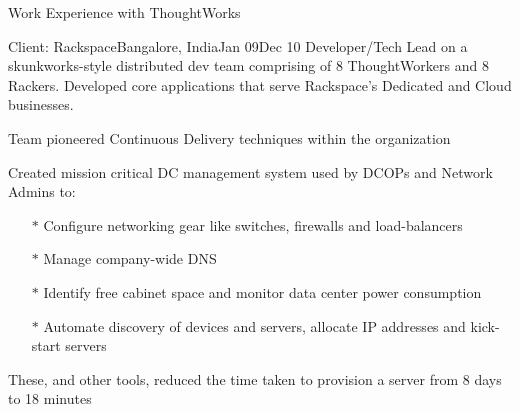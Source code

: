 \documentclass{resume} %
\begin{document}
\begin{rSection}{Work Experience with ThoughtWorks}

\begin{rSubsection}{Client: Rackspace}{Bangalore, India}{Jan 09}{Dec
    10}
{Developer/Tech Lead on a skunkworks-style distributed dev team comprising of 8
  ThoughtWorkers and 8 Rackers. Developed core applications that
serve Rackspace's Dedicated and Cloud businesses.}

\item Team pioneered Continuous Delivery techniques within the organization
\item Created mission critical DC management system used by
  DCOPs and Network Admins to:
\vspace{-0.5em}
\begin{itemize}  \itemsep0.5pt \parskip0pt
    \item[$\ast$] Configure networking gear like switches, firewalls and load-balancers
    \item[$\ast$] Manage company-wide DNS
    \item[$\ast$] Identify free cabinet space and monitor data center power consumption
    \item[$\ast$] Automate discovery of devices and servers, allocate IP addresses and kick-start servers
\end{itemize}
\item These, and other tools, reduced the time taken to provision a server from 8 days to 18 minutes
\end{rSubsection}

\end{rSection}

\end{document}
